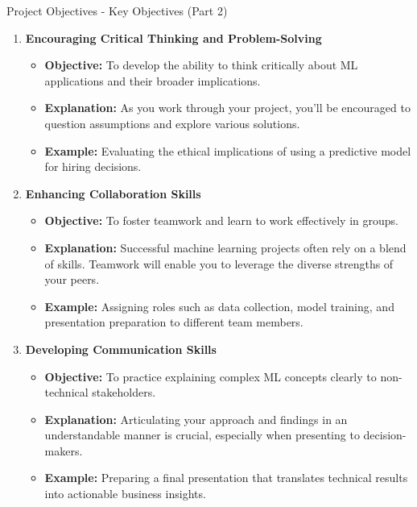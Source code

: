 \documentclass[aspectratio=169]{beamer}
\begin{document}
\begin{frame}[fragile]{Project Objectives - Key Objectives (Part 2)}
    \begin{enumerate}[start=3]
        \item \textbf{Encouraging Critical Thinking and Problem-Solving}
        \begin{itemize}
            \item \textbf{Objective:} To develop the ability to think critically about ML applications and their broader implications.
            \item \textbf{Explanation:} As you work through your project, you’ll be encouraged to question assumptions and explore various solutions.
            \item \textbf{Example:} Evaluating the ethical implications of using a predictive model for hiring decisions.
        \end{itemize}

        \item \textbf{Enhancing Collaboration Skills}
        \begin{itemize}
            \item \textbf{Objective:} To foster teamwork and learn to work effectively in groups.
            \item \textbf{Explanation:} Successful machine learning projects often rely on a blend of skills. Teamwork will enable you to leverage the diverse strengths of your peers.
            \item \textbf{Example:} Assigning roles such as data collection, model training, and presentation preparation to different team members.
        \end{itemize}

        \item \textbf{Developing Communication Skills}
        \begin{itemize}
            \item \textbf{Objective:} To practice explaining complex ML concepts clearly to non-technical stakeholders.
            \item \textbf{Explanation:} Articulating your approach and findings in an understandable manner is crucial, especially when presenting to decision-makers.
            \item \textbf{Example:} Preparing a final presentation that translates technical results into actionable business insights.
        \end{itemize}
    \end{enumerate}
\end{frame}
\end{document}
